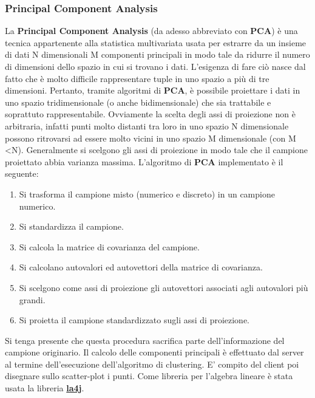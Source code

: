 \documentclass{article}
\begin{document}
	\subsubsection{Principal Component Analysis}
	La \textbf{Principal Component Analysis} (da adesso abbreviato con
	\textbf{PCA}) è una tecnica appartenente alla statistica multivariata
	usata per estrarre da un insieme di dati N dimensionali M componenti
	principali in modo tale da ridurre il numero di dimensioni dello spazio
	in cui si trovano i dati. L'esigenza di fare ciò nasce dal fatto che è
	molto difficile rappresentare tuple in uno spazio a più di tre
	dimensioni. Pertanto, tramite algoritmi di \textbf{PCA}, è possibile
	proiettare i dati in uno spazio tridimensionale (o anche bidimensionale)
	che sia trattabile e soprattuto rappresentabile. Ovviamente la scelta
	degli assi di proiezione non è arbitraria, infatti punti molto distanti
	tra loro in uno spazio N dimensionale possono ritrovarsi ad essere molto
	vicini in uno spazio M dimensionale (con M \textless N). Generalmente
	si scelgono gli assi di proiezione in modo tale che il campione
	proiettato abbia varianza massima. L'algoritmo di \textbf{PCA}
	implementato è il seguente:
	\begin{enumerate}
		\item Si trasforma il campione misto (numerico e discreto) in
		un campione numerico.
		\item Si standardizza il campione.
		\item Si calcola la matrice di covarianza del campione.
		\item Si calcolano autovalori ed autovettori della matrice di
		covarianza.
		\item Si scelgono come assi di proiezione gli autovettori
		associati agli autovalori più grandi.
		\item Si proietta il campione standardizzato sugli assi di
		proiezione.
	\end{enumerate}
	Si tenga presente che questa procedura sacrifica parte dell'informazione
	del campione originario. Il calcolo delle componenti principali è
	effettuato dal server al termine dell'esecuzione dell'algoritmo di
	clustering. E' compito del client poi disegnare sullo scatter-plot
	i punti. Come libreria per l'algebra lineare è stata usata la libreria
	\href{http://la4j.org}{\textbf{la4j}}.
\end{document}

